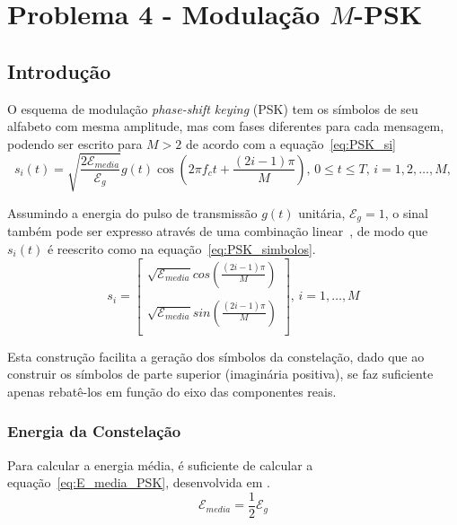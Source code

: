 \section{Problema 4 - Modulação \texorpdfstring{$M$}{M}-PSK}

\subsection{Introdução}
O esquema de modulação \textit{phase-shift keying} (PSK) tem os símbolos de seu alfabeto com mesma amplitude, mas com fases diferentes para cada mensagem, podendo ser escrito para $M > 2$ de acordo com a equação~\ref{eq:PSK_si}
\begin{equation}
    s_i(t) = \sqrt{\frac{2\mathcal{E}_{media}}{\mathcal{E}_g}} g(t) \cos\left(2\pi f_c t + \frac{(2i-1)\pi}{M}\right), \, 0 \leq t \leq T, \, i = 1,2,\dots,M,
    \label{eq:PSK_si}
\end{equation}

Assumindo a energia do pulso de transmissão $g(t)$ unitária, $\mathcal{E}_g = 1$, o sinal também pode ser expresso através de uma combinação linear~\cite{Cecilio}, de modo que $s_i(t)$ é reescrito como na equação~\ref{eq:PSK_simbolos}.
\begin{equation}
    s_i =   \begin{bmatrix}
                \sqrt{\mathcal{E}_{media}} cos(\frac{(2i-1)\pi}{M}) \\
                \\ 
                \sqrt{\mathcal{E}_{media}} sin(\frac{(2i-1)\pi}{M}) \\ 
            \end{bmatrix}, \, i = 1,\dots,M
    \label{eq:PSK_simbolos}
\end{equation}

Esta construção facilita a geração dos símbolos da constelação, dado que ao construir os símbolos de parte superior (imaginária positiva), se faz suficiente apenas rebatê-los em função do eixo das componentes reais.
\subsubsection{Energia da Constelação} 
Para calcular a energia média, é suficiente de calcular a equação~\ref{eq:E_media_PSK}, desenvolvida em \cite{Cecilio,Proakis}.
\begin{equation}
    \mathcal{E}_{media} = \frac{1}{2} \mathcal{E}_g
    \label{eq:E_media_PSK}
\end{equation}

